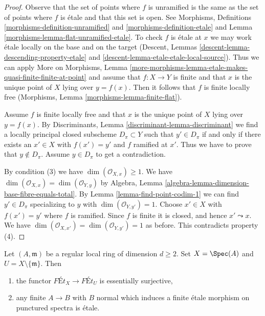 \begin{proof}
Observe that the set of points where $f$ is unramified is the same as
the set of points where $f$ is \'etale and that this set is open.
See Morphisms, Definitions \ref{morphisms-definition-unramified}
and \ref{morphisms-definition-etale} and
Lemma \ref{morphisms-lemma-flat-unramified-etale}.
To check $f$ is \'etale at $x$ we may work \'etale
locally on the base and on the
target (Descent, Lemmas \ref{descent-lemma-descending-property-etale} and
\ref{descent-lemma-etale-etale-local-source}).
Thus we can apply More on Morphisms, Lemma
\ref{more-morphisms-lemma-etale-makes-quasi-finite-finite-at-point}
and assume that $f : X \to Y$ is finite and that $x$ is the unique
point of $X$ lying over $y = f(x)$.
Then it follows that $f$ is finite locally free
(Morphisms, Lemma \ref{morphisms-lemma-finite-flat}).

\medskip\noindent
Assume $f$ is finite locally free and that $x$ is the unique point of
$X$ lying over $y = f(x)$. By
Discriminants, Lemma \ref{discriminant-lemma-discriminant}
we find a locally principal closed subscheme $D_\pi \subset Y$
such that $y' \in D_\pi$ if and only if there exists an $x' \in X$
with $f(x') = y'$ and $f$ ramified at $x'$. Thus we have to prove
that $y \not \in D_\pi$. Assume $y \in D_\pi$ to get a contradiction.

\medskip\noindent
By condition (3) we have $\dim(\mathcal{O}_{X, x}) \geq 1$.
We have $\dim(\mathcal{O}_{X, x}) = \dim(\mathcal{O}_{Y, y})$ by
Algebra, Lemma \ref{algebra-lemma-dimension-base-fibre-equals-total}.
By Lemma \ref{lemma-find-point-codim-1}
we can find $y' \in D_\pi$ specializing to $y$
with $\dim(\mathcal{O}_{Y, y'}) = 1$.
Choose $x' \in X$ with $f(x') = y'$ where $f$ is ramified. Since $f$
is finite it is closed, and hence $x' \leadsto x$.
We have $\dim(\mathcal{O}_{X, x'}) = \dim(\mathcal{O}_{Y, y'}) = 1$
as before. This contradicts property (4).
\end{proof}

\begin{lemma}
\label{lemma-local-purity}
Let $(A, \mathfrak m)$ be a regular local ring of dimension $d \geq 2$.
Set $X = \Spec(A)$ and $U = X \setminus \{\mathfrak m\}$. Then
\begin{enumerate}
\item the functor $\textit{F\'Et}_X \to \textit{F\'Et}_U$
is essentially surjective,
\item any finite $A \to B$ with $B$ normal which
induces a finite \'etale morphism on punctured spectra is \'etale.
\end{enumerate}
\end{lemma}

